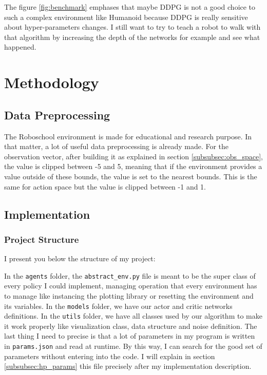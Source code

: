 \documentclass{article}
\begin{document}
The figure \ref{fig:benchmark} emphases that maybe DDPG is not a good choice to
such a complex environment like Humanoid because DDPG is really sensitive about
hyper-parameters changes. I still want to try to teach a robot to walk with that
algorithm by increasing the depth of the networks for example and see what
happened.  

\section{Methodology}

\subsection{Data Preprocessing}

The Roboschool environment is made for educational and research purpose. In that
matter, a lot of useful data preprocessing is already made. For the observation
vector, after building it as explained in section \ref{subsubsec:obs_space}, the
value is clipped between -5 and 5, meaning that if the environment provides a
value outside of these bounds, the value is set to the nearest bounds. This is
the same for action space but the value is clipped between -1 and 1. 

\subsection{Implementation}

\subsubsection{Project Structure}

I present you below the structure of my project:


In the \verb?agents? folder, the \verb?abstract_env.py? file is meant to be the
super class of every policy I could implement, managing operation that every
environment has to manage like instancing the plotting library or resetting the
environment and its variables. In the \verb?models? folder, we have our actor
and critic networks definitions. In the \verb?utils? folder, we have all classes
used by our algorithm to make it work properly like visualization class, data
structure and noise definition. The last thing I need to precise is that a lot
of parameters in my program is written in \verb?params.json? and read at
runtime. By this way, I can search for the good set of parameters without
entering into the code. I will explain in section \ref{subsubsec:hp_params} this
file precisely after my implementation description.
\end{document}
